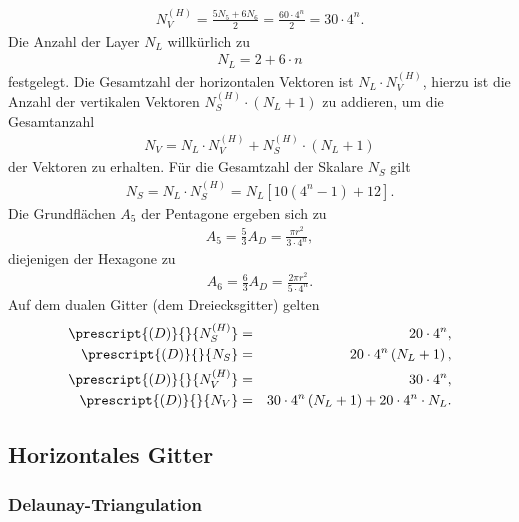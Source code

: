 \documentclass{book}
\begin{document}
%
\begin{eqnarray}
N_V^{(H)} = \frac{5N_5 + 6N_6}{2} = \frac{60\cdot 4^n}{2} = 30\cdot 4^n.
\end{eqnarray}
%
Die Anzahl der Layer $N_L$ willkürlich zu
%
\begin{eqnarray}
N_L = 2 + 6\cdot n
\end{eqnarray}
%
festgelegt. Die Gesamtzahl der horizontalen Vektoren ist $N_L\cdot N_V^{(H)}$, hierzu ist die Anzahl der vertikalen Vektoren $N_S^{(H)}\cdot\left(N_L + 1\right)$ zu addieren, um die Gesamtanzahl
%
\begin{eqnarray}
N_V = N_L\cdot N_V^{(H)} + N_S^{(H)}\cdot\left(N_L + 1\right)
\end{eqnarray}
%
der Vektoren zu erhalten. Für die Gesamtzahl der Skalare $N_S$ gilt
%
\begin{eqnarray}
N_S = N_L\cdot N_S^{(H)} = N_L\left[10\left(4^n - 1\right) + 12\right].
\end{eqnarray}
%
Die Grundflächen $A_5$ der Pentagone ergeben sich zu
%
\begin{eqnarray}
A_5 = \frac{5}{3}A_D = \frac{\pi r^2}{3\cdot 4^n}, 
\end{eqnarray}
%
diejenigen der Hexagone zu
%
\begin{eqnarray}
A_6 = \frac{6}{3}A_D = \frac{2\pi r^2}{5\cdot 4^n}.
\end{eqnarray}
%
Auf dem dualen Gitter (dem Dreiecksgitter) gelten
%
\begin{eqnarray}
\prescript{{(D)}}{}{N_S^{(H)}} & = & 20\cdot 4^n,\\
\prescript{{(D)}}{}{N_S} & = & 20\cdot 4^n\left(N_L + 1\right),\\
\prescript{{(D)}}{}{N_V^{(H)}} & = & 30\cdot 4^n,\\
\prescript{{(D)}}{}{N_V} & = & 30\cdot 4^n\left(N_L + 1\right) + 20\cdot 4^n\cdot N_L.
\end{eqnarray}

\subsection{Horizontales Gitter}
\label{sec:horizontales_gitter}

\subsubsection{Delaunay-Triangulation}
\label{sec:delaunay-trangulation}
\end{document}
